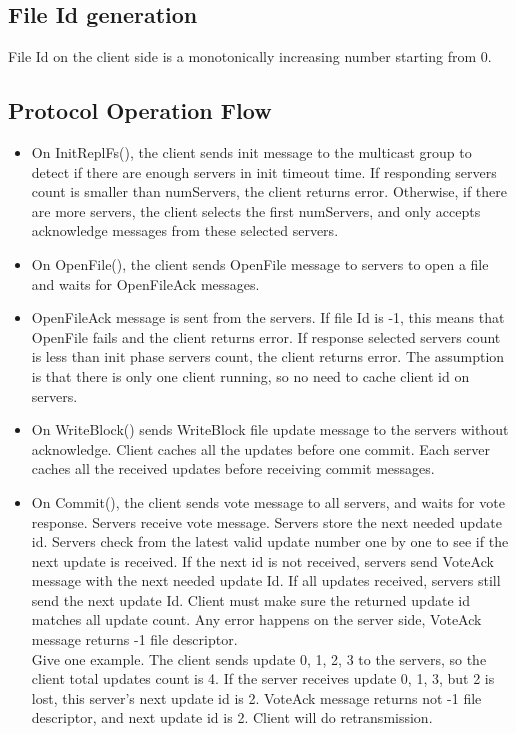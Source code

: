 \documentclass[12pt,fleqn]{article}
\begin{document}
\subsection{File Id generation}
File Id on the client side is a monotonically increasing number starting from 0.

\subsection{Protocol Operation Flow}
\begin{itemize}
	\item On InitReplFs(), the client sends init message to the multicast group to detect if there are enough servers in init timeout time. If responding servers count is smaller than numServers, the client returns error. Otherwise, if there are more servers, the client selects the first numServers, and only accepts acknowledge messages from these selected servers.
	\item On OpenFile(), the client sends OpenFile message to servers to open a file and waits for OpenFileAck messages.
	\item OpenFileAck message is sent from the servers. If file Id is -1, this means that OpenFile fails and the client returns error. If response selected servers count is less than init phase servers count, the client returns error. The assumption is that there is only one client running, so no need to cache client id on servers.
	\item On WriteBlock() sends WriteBlock file update message to the servers without acknowledge. Client caches all the updates before one commit. Each server caches all the received updates before receiving commit messages.
	\item On Commit(), the client sends vote message to all servers, and waits for vote response. Servers receive vote message. Servers store the next needed update id. Servers check from the latest valid update number one by one to see if the next update is received. If the next id is not received, servers send VoteAck message with the next needed update Id. If all updates received, servers still send the next update Id. Client must make sure the returned update id matches all update count. Any error happens on the server side, VoteAck message returns -1 file descriptor. \\ 
	Give one example. The client sends update 0, 1, 2, 3 to the servers, so the client total updates count is 4. If the server receives update 0, 1, 3, but 2 is lost, this server's next update id is 2. VoteAck message returns not -1 file descriptor, and next update id is 2. Client will do retransmission.

\end{itemize}
\end{document}
